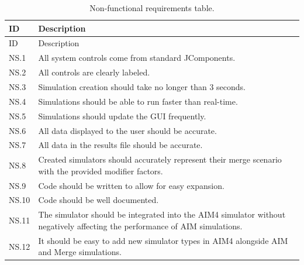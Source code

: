 \begin{longtable}{|p{0.1\linewidth}|p{0.9\linewidth}|}
\caption{Non-functional requirements table.}\label{tab:nonFunctionalRequirements}\\
\hline
ID & Description \\
\hline
\endfirsthead

\hline
ID & Description \\
\hline
\endhead

\hline
\endfoot

\hline
\endlastfoot

NS.1 & All system controls come from standard JComponents. \\
NS.2 & All controls are clearly labeled. \\
NS.3 & Simulation creation should take no longer than 3 seconds. \\
NS.4 & Simulations should be able to run faster than real-time. \\
NS.5 & Simulations should update the GUI frequently. \\
NS.6 & All data displayed to the user should be accurate. \\
NS.7 & All data in the results file should be accurate. \\
NS.8 & Created simulators should accurately represent their merge scenario with the provided modifier factors. \\
NS.9 & Code should be written to allow for easy expansion. \\
NS.10 & Code should be well documented. \\
NS.11 & The simulator should be integrated into the AIM4 simulator without negatively affecting the performance of AIM simulations. \\
NS.12 & It should be easy to add new simulator types in AIM4 alongside AIM and Merge simulations. \\
\end{longtable}